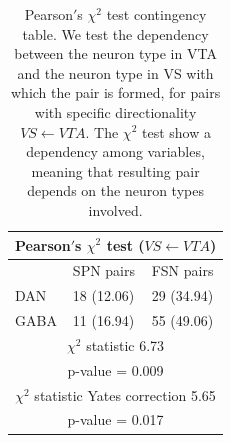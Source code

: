 \begin{table}[H]
\begin{tabular}{ |p{3cm}|p{3cm}|p{3cm}| }
 \hline
 \multicolumn{3}{|c|}{Pearson$'$s $\chi^2$ test ($VS \leftarrow VTA$)} \\
 \hline
 & SPN pairs & FSN pairs\\
 \hline
 DAN & 18 (12.06) & 29 (34.94) \\
 \hline
 GABA & 11 (16.94) & 55 (49.06)\\
 \hline
 \multicolumn{3}{|c|}{$\chi^2$ statistic  6.73}\\
 \multicolumn{3}{|c|}{p-value = 0.009}\\
 \hline
 \multicolumn{3}{|c|}{$\chi^2$ statistic Yates correction 5.65}\\
 \multicolumn{3}{|c|}{p-value = 0.017}\\
 \hline
\end{tabular}
\caption{Pearson$'$s $\chi^{2}$ test contingency table. We test the dependency between the neuron type in VTA and the neuron type in VS with which the pair is formed, for pairs with specific directionality $VS \leftarrow VTA$. The $\chi^2$ test show a dependency among variables, meaning that resulting pair depends on the neuron types involved.}
\label{tab:chisquare_vtavs}
\end{table}
